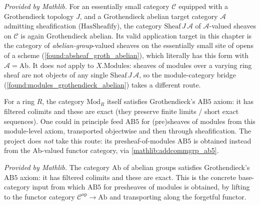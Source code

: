 \begin{lemma}
  \label{mathlib:sheaf_groth_abelian}
  \mathlibok
  \textit{Provided by Mathlib.}
  For an essentially small category \(\mathcal C\) equipped with a Grothendieck
  topology \(J\), and a Grothendieck abelian target category \(\mathcal A\)
  admitting sheafification (\(\mathrm{HasSheafify}\)), the category
  \(\mathrm{Sheaf}\,J\,\mathcal A\) of \(\mathcal A\)-valued sheaves on
  \(\mathcal C\) is again Grothendieck abelian.  Its valid application target in
  this chapter is the category of \emph{abelian-group}-valued sheaves on the
  essentially small site of opens of a scheme (\cref{found:absheaf_groth_abelian}),
  which literally has this form with \(\mathcal A=\mathrm{Ab}\).  It does
  \emph{not} apply to \(X.\mathrm{Modules}\): sheaves of modules over a varying
  ring sheaf are not objects of any single \(\mathrm{Sheaf}\,J\,\mathcal A\), so
  the module-category bridge (\cref{found:modules_grothendieck_abelian}) takes a
  different route.
\end{lemma}

\begin{remark}
  For a ring \(R\), the category \(\mathrm{Mod}_R\) itself satisfies
  Grothendieck's \(\mathrm{AB5}\) axiom: it has filtered colimits and these are
  exact (they preserve finite limits / short exact sequences).  One could in
  principle feed \(\mathrm{AB5}\) for (pre)sheaves of modules from this module-level
  axiom, transported objectwise and then through sheafification.  The project does
  \emph{not} take this route: its presheaf-of-modules \(\mathrm{AB5}\) is obtained
  instead from the \(\mathrm{Ab}\)-valued functor category, via
  \cref{mathlib:addcommgrp_ab5}.
\end{remark}

\begin{lemma}
  \label{mathlib:addcommgrp_ab5}
  \mathlibok
  \textit{Provided by Mathlib.}
  The category \(\mathrm{Ab}\) of abelian groups satisfies Grothendieck's
  \(\mathrm{AB5}\) axiom: it has filtered colimits and these are exact.  This is
  the concrete base-category input from which \(\mathrm{AB5}\) for presheaves of
  modules is obtained, by lifting to the functor category \(\mathcal C^{\mathrm{op}}
  \to\mathrm{Ab}\) and transporting along the forgetful functor.
\end{lemma}

